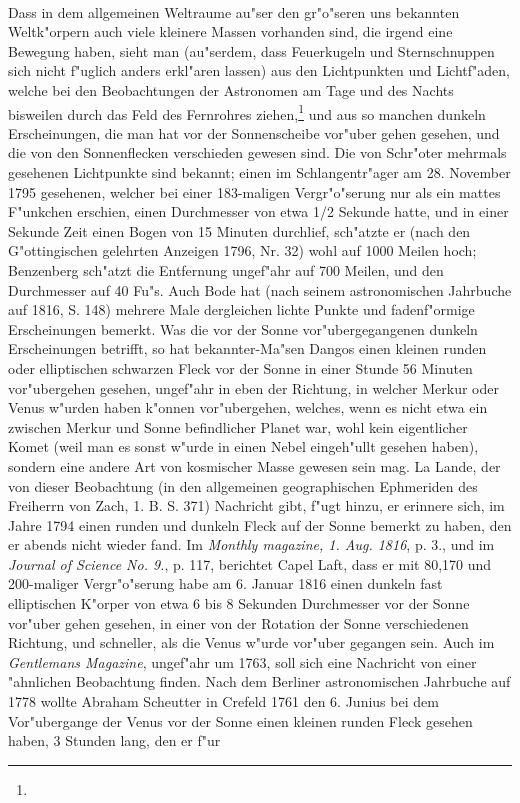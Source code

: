 \documentclass[a4paper, 11pt, oneside, polutonikogreek, german]{article}
\begin{document}
\paragraph{}
Dass in dem allgemeinen Weltraume au"ser den gr"o"seren uns bekannten Weltk"orpern auch viele kleinere Massen vorhanden sind, die irgend eine Bewegung haben, sieht man (au"serdem, dass Feuerkugeln und Sternschnuppen sich nicht f"uglich anders erkl"aren lassen) aus den Lichtpunkten und Lichtf"aden, welche bei den Beobachtungen der Astronomen am Tage und des Nachts bisweilen durch das Feld des Fernrohres ziehen,\footnote{} und aus so manchen dunkeln Erscheinungen, die man hat vor der Sonnenscheibe vor"uber gehen gesehen, und die von den Sonnenflecken verschieden gewesen sind. Die von Schr"oter mehrmals gesehenen Lichtpunkte sind bekannt; einen im Schlangentr"ager am 28. November 1795 gesehenen, welcher bei einer 183-maligen Vergr"o"serung nur als ein mattes F"unkchen erschien, einen Durchmesser von etwa 1/2 Sekunde hatte, und in einer Sekunde Zeit einen Bogen von 15 Minuten durchlief, sch"atzte er (nach den G"ottingischen gelehrten Anzeigen 1796, Nr. 32) wohl auf 1000 Meilen hoch; Benzenberg sch"atzt die Entfernung ungef"ahr auf 700 Meilen, und den Durchmesser auf 40 Fu"s. Auch Bode hat (nach seinem astronomischen Jahrbuche auf 1816, S. 148) mehrere Male dergleichen lichte Punkte und fadenf"ormige Erscheinungen bemerkt. Was die vor der Sonne vor"ubergegangenen dunkeln Erscheinungen betrifft, so hat bekannter-Ma"sen Dangos einen kleinen runden oder elliptischen schwarzen Fleck vor der Sonne in einer Stunde 56 Minuten vor"ubergehen gesehen, ungef"ahr in eben der Richtung, in welcher Merkur oder Venus w"urden haben k"onnen vor"ubergehen, welches, wenn es nicht etwa ein zwischen Merkur und Sonne befindlicher Planet war, wohl kein eigentlicher Komet (weil man es sonst w"urde in einen Nebel eingeh"ullt gesehen haben), sondern eine andere Art von kosmischer Masse gewesen sein mag. La Lande, der von dieser Beobachtung (in den allgemeinen geographischen Ephmeriden des Freiherrn von Zach, 1. B. S. 371) Nachricht gibt, f"ugt hinzu, er erinnere sich, im Jahre 1794 einen runden und dunkeln Fleck auf der Sonne bemerkt zu haben, den er abends nicht wieder fand. Im \emph{Monthly magazine, 1. Aug. 1816}, p. 3., und im \emph{Journal of Science No. 9.}, p. 117, berichtet Capel Laft, dass er mit 80,170 und 200-maliger Vergr"o"serung habe am 6. Januar 1816 einen dunkeln fast elliptischen K"orper von etwa 6 bis 8 Sekunden Durchmesser vor der Sonne vor"uber gehen gesehen, in einer von der Rotation der Sonne verschiedenen Richtung, und schneller, als die Venus w"urde vor"uber gegangen sein. Auch im \emph{Gentlemans Magazine}, ungef"ahr um 1763, soll sich eine Nachricht von einer "ahnlichen Beobachtung finden. Nach dem Berliner astronomischen Jahrbuche auf 1778 wollte Abraham Scheutter in Crefeld 1761 den 6. Junius bei dem Vor"ubergange der Venus vor der Sonne einen kleinen runden Fleck gesehen haben, 3 Stunden lang, den er f"ur 
\end{document}

